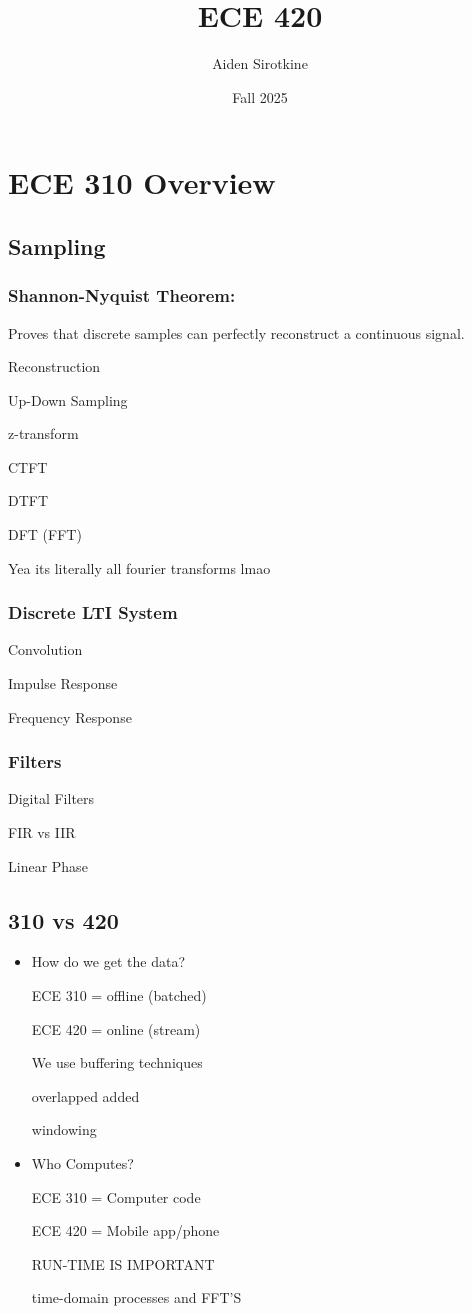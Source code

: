 \documentclass[fleqn]{report}
\date{Fall 2025}
\title{ECE 420}
\author{Aiden Sirotkine}
\begin{document}
\pagestyle{fancy}
\maketitle
\tableofcontents
\clearpage

\chapter{ECE 310 Overview}
\section{Sampling}
\subsection{Shannon-Nyquist Theorem: }

Proves that discrete samples can perfectly reconstruct a continuous signal. 

Reconstruction 

Up-Down Sampling

z-transform 

CTFT 

DTFT 

DFT (FFT)

Yea its literally all fourier transforms lmao

\subsection{Discrete LTI System}
Convolution 

Impulse Response 

Frequency Response 

\subsection{Filters}
Digital Filters 

FIR vs IIR 

Linear Phase 

\section{310 vs 420}
\begin{itemize}
    \item 
    How do we get the data? 

    ECE 310 = offline (batched)

    ECE 420 = online (stream)

    We use buffering techniques 

    overlapped added 

    windowing

    \item 
    Who Computes?

    ECE 310 = Computer code 

    ECE 420 = Mobile app/phone

    RUN-TIME IS IMPORTANT 

    time-domain processes and FFT'S

\end{itemize}
\end{document}
